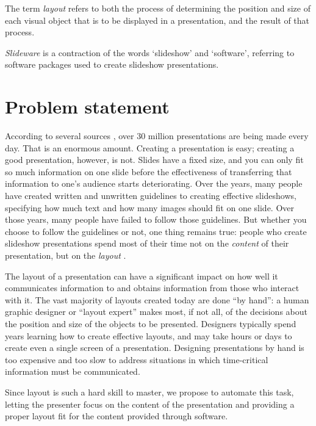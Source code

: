    The term \emph{layout} refers to both the process of determining the
   position and size of each visual object that is to be displayed in a
   presentation, and the result of that process.

   \emph{Slideware} is a contraction of the words `slideshow' and `software',
   referring to software packages used to create slideshow presentations.

  \section{Problem statement}

   According to several sources \citep{parker-1, drucker-1, bajaj-1}, over 30
   million \ppt presentations are being made every day. That is an enormous
   amount. Creating a \ppt presentation is easy; creating a good \ppt
   presentation, however, is not. Slides have a fixed size, and you can only
   fit so much information on one slide before the effectiveness of
   transferring that information to one's audience starts deteriorating. Over
   the years, many people have created written and unwritten guidelines to
   creating effective slideshows, specifying how much text and how many images
   should fit on one slide. Over those years, many people have failed to follow
   those guidelines. But whether you choose to follow the guidelines or
   not, one thing remains true: people who create slideshow presentations spend
   most of their time not on the \emph{content} of their presentation, but on the
   \emph{layout} \citep{lok-1}.


   The layout of a presentation can have a significant impact on how well it
   communicates information to and obtains information from those who interact
   with it. The vast majority of layouts created today are done ``by hand'': a
   human graphic designer or ``layout expert'' makes most, if not all, of the
   decisions about the position and size of the objects to be presented.
   Designers typically spend years learning how to create effective layouts,
   and may take hours or days to create even a single screen of a presentation.
   Designing presentations by hand is too expensive and too slow to address
   situations in which time-critical information must be communicated.

   Since layout is such a hard skill to master, we propose to automate this
   task, letting the presenter focus on the content of the presentation and
   providing a proper layout fit for the content provided through software.


